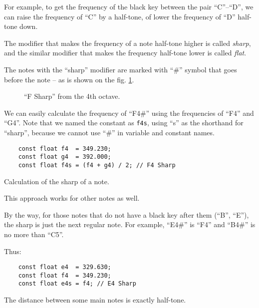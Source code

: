 \documentclass[../sparc.tex]{subfiles}
\begin{document}
For example, to get the frequency of the black key between the pair ``C''--``D'',
we can raise the frequency of ``C'' by a half-tone, of lower the frequency of
``D'' half-tone down.

The modifier that makes the frequency of a note half-tone higher is called
\emph{sharp}, and the similar modifier that makes the frequency half-tone lower
is called \emph{flat}.


The notes with the ``sharp'' modifier are marked with ``\#'' symbol that goes
before the note -- as is shown on the fig. \ref{fig:lilypond-f4-sharp}.

\begin{figure}[ht]
  \centering
  \caption{``F Sharp'' from the 4th octave.}
  \label{fig:lilypond-f4-sharp}
\end{figure}

We can easily calculate the frequency of ``F4\#'' using the frequencies of
``F4'' and ``G4''.  Note that we named the constant as \texttt{f4s}, using ``s''
as the shorthand for ``sharp'', because we cannot use ``\#'' in variable and
constant names.

\begin{listing}[ht]
  \begin{verbatim}
    const float f4  = 349.230;
    const float g4  = 392.000;
    const float f4s = (f4 + g4) / 2; // F4 Sharp
  \end{verbatim}
  \label{listing:music-f4-sharp}
  \caption{Calculation of the sharp of a note.}
\end{listing}

This approach works for other notes as well.

By the way, for those notes that do not have a black key after them (``B'',
``E''), the sharp is just the next regular note.  For example, ``E4\#'' is
``F4'' and ``B4\#'' is no more than ``C5''.

Thus:

\begin{listing}[ht]
  \begin{verbatim}
    const float e4  = 329.630;
    const float f4  = 349.230;
    const float e4s = f4; // E4 Sharp
  \end{verbatim}
  \caption{The distance between some main notes is exactly half-tone.}
  \label{listing:music-e4-sharp}
\end{listing}
\end{document}
